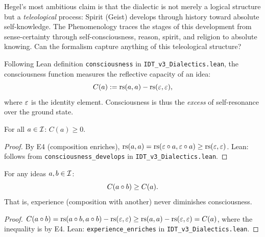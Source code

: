 Hegel's most ambitious claim is that the dialectic is not merely a logical
structure but a \emph{teleological} process: Spirit (Geist) develops through
history toward absolute self-knowledge. The Phenomenology traces the stages
of this development from sense-certainty through self-consciousness, reason,
spirit, and religion to absolute knowing. Can the formalism capture anything
of this teleological structure?

\begin{definition}
\label{def:consciousness-function-tel}
Following Lean definition \texttt{consciousness} in
\texttt{IDT\_v3\_Dialectics.lean}, the consciousness function measures
the reflective capacity of an idea:
\[
C(a) := \mathrm{rs}(a, a) - \mathrm{rs}(\varepsilon, \varepsilon),
\]
where $\varepsilon$ is the identity element. Consciousness is thus the
\emph{excess} of self-resonance over the ground state.
\end{definition}

\begin{theorem}
\label{thm:consciousness-nonneg}
For all $a \in \mathcal{I}$: $C(a) \geq 0$.
\end{theorem}

\begin{proof}
By E4 (composition enriches), $\mathrm{rs}(a, a) = \mathrm{rs}(\varepsilon \circ a, \varepsilon \circ a)
\geq \mathrm{rs}(\varepsilon, \varepsilon)$.
Lean: follows from \texttt{consciousness\_develops} in
\texttt{IDT\_v3\_Dialectics.lean}.
\end{proof}

\begin{theorem}
\label{thm:consciousness-develops-tel}
For any ideas $a, b \in \mathcal{I}$:
\[
C(a \circ b) \geq C(a).
\]
That is, experience (composition with another) never diminishes consciousness.
\end{theorem}

\begin{proof}
$C(a \circ b) = \mathrm{rs}(a \circ b, a \circ b) - \mathrm{rs}(\varepsilon, \varepsilon)
\geq \mathrm{rs}(a, a) - \mathrm{rs}(\varepsilon, \varepsilon) = C(a)$,
where the inequality is by E4.
Lean: \texttt{experience\_enriches} in \texttt{IDT\_v3\_Dialectics.lean}.
\end{proof}

